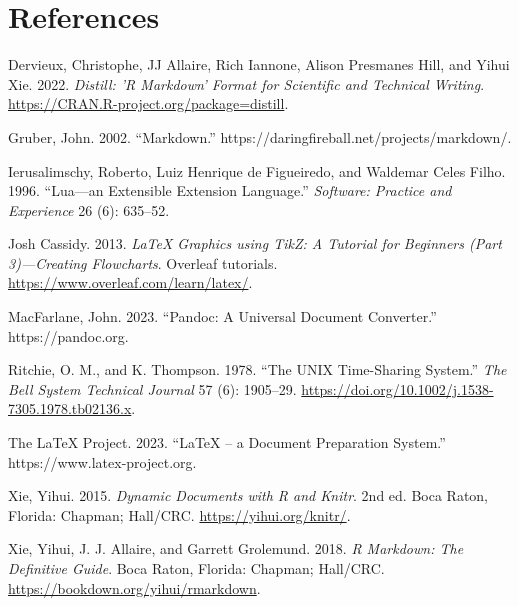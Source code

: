 \hypertarget{references}{%
\section*{References}\label{references}}

\hypertarget{refs}{}
\begin{CSLReferences}{1}{0}
\leavevmode{}%
Dervieux, Christophe, JJ Allaire, Rich Iannone, Alison Presmanes Hill, and Yihui Xie. 2022. \emph{Distill: 'R Markdown' Format for Scientific and Technical Writing}. \url{https://CRAN.R-project.org/package=distill}.

\leavevmode{}%
Gruber, John. 2002. {``Markdown.''} https://daringfireball.net/projects/markdown/.

\leavevmode{}%
Ierusalimschy, Roberto, Luiz Henrique de Figueiredo, and Waldemar Celes Filho. 1996. {``Lua---an Extensible Extension Language.''} \emph{Software: Practice and Experience} 26 (6): 635--52.

\leavevmode{}%
Josh Cassidy. 2013. \emph{{LaTeX Graphics using TikZ: A Tutorial for Beginners (Part 3)---Creating Flowcharts}}. Overleaf tutorials. \url{https://www.overleaf.com/learn/latex/}.

\leavevmode{}%
MacFarlane, John. 2023. {``Pandoc: A Universal Document Converter.''} https://pandoc.org.

\leavevmode{}%
Ritchie, O. M., and K. Thompson. 1978. {``The UNIX Time-Sharing System.''} \emph{The Bell System Technical Journal} 57 (6): 1905--29. \url{https://doi.org/10.1002/j.1538-7305.1978.tb02136.x}.

\leavevmode{}%
The LaTeX Project. 2023. {``LaTeX -- a Document Preparation System.''} https://www.latex-project.org.

\leavevmode{}%
Xie, Yihui. 2015. \emph{Dynamic Documents with {R} and Knitr}. 2nd ed. Boca Raton, Florida: Chapman; Hall/CRC. \url{https://yihui.org/knitr/}.

\leavevmode{}%
Xie, Yihui, J. J. Allaire, and Garrett Grolemund. 2018. \emph{R Markdown: The Definitive Guide}. Boca Raton, Florida: Chapman; Hall/CRC. \url{https://bookdown.org/yihui/rmarkdown}.

\end{CSLReferences}

